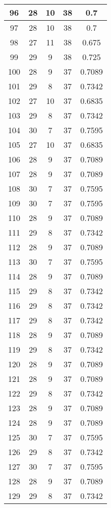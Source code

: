 \documentclass[letterpaper, 12pt]{article}
\begin{document}
\begin{longtable}{|c|c|c|c|c|}
\hline
96 & 28 & 10 & 38 & 0.7 \\
\hline
97 & 28 & 10 & 38 & 0.7 \\
\hline
98 & 27 & 11 & 38 & 0.675 \\
\hline
99 & 29 & 9 & 38 & 0.725 \\
\hline
100 & 28 & 9 & 37 & 0.7089 \\
\hline
101 & 29 & 8 & 37 & 0.7342 \\
\hline
102 & 27 & 10 & 37 & 0.6835 \\
\hline
103 & 29 & 8 & 37 & 0.7342 \\
\hline
104 & 30 & 7 & 37 & 0.7595 \\
\hline
105 & 27 & 10 & 37 & 0.6835 \\
\hline
106 & 28 & 9 & 37 & 0.7089 \\
\hline
107 & 28 & 9 & 37 & 0.7089 \\
\hline
108 & 30 & 7 & 37 & 0.7595 \\
\hline
109 & 30 & 7 & 37 & 0.7595 \\
\hline
110 & 28 & 9 & 37 & 0.7089 \\
\hline
111 & 29 & 8 & 37 & 0.7342 \\
\hline
112 & 28 & 9 & 37 & 0.7089 \\
\hline
113 & 30 & 7 & 37 & 0.7595 \\
\hline
114 & 28 & 9 & 37 & 0.7089 \\
\hline
115 & 29 & 8 & 37 & 0.7342 \\
\hline
116 & 29 & 8 & 37 & 0.7342 \\
\hline
117 & 29 & 8 & 37 & 0.7342 \\
\hline
118 & 28 & 9 & 37 & 0.7089 \\
\hline
119 & 29 & 8 & 37 & 0.7342 \\
\hline
120 & 28 & 9 & 37 & 0.7089 \\
\hline
121 & 28 & 9 & 37 & 0.7089 \\
\hline
122 & 29 & 8 & 37 & 0.7342 \\
\hline
123 & 28 & 9 & 37 & 0.7089 \\
\hline
124 & 28 & 9 & 37 & 0.7089 \\
\hline
125 & 30 & 7 & 37 & 0.7595 \\
\hline
126 & 29 & 8 & 37 & 0.7342 \\
\hline
127 & 30 & 7 & 37 & 0.7595 \\
\hline
128 & 28 & 9 & 37 & 0.7089 \\
\hline
129 & 29 & 8 & 37 & 0.7342 \\

\end{longtable}
\end{document}
